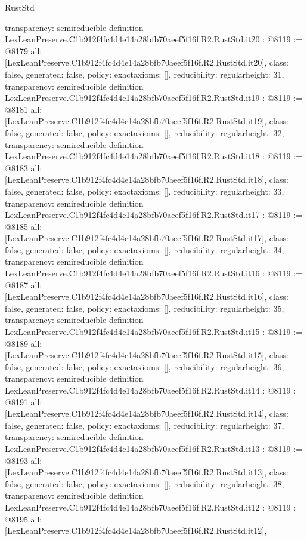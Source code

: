 \begin{lexlean}{RustStd}
\begin{coremodule}
{  transparency: semireducible
}
definition LexLeanPreserve.C1b912f4fc4d4e14a28bfb70aeef5f16f.R2.RustStd.it20 : @8119 := @8179 {
  all: [LexLeanPreserve.C1b912f4fc4d4e14a28bfb70aeef5f16f.R2.RustStd.it20],
  class: false,
  generated: false,
  policy: exact{axioms: []},
  reducibility: regular{height: 31},
  transparency: semireducible
}
definition LexLeanPreserve.C1b912f4fc4d4e14a28bfb70aeef5f16f.R2.RustStd.it19 : @8119 := @8181 {
  all: [LexLeanPreserve.C1b912f4fc4d4e14a28bfb70aeef5f16f.R2.RustStd.it19],
  class: false,
  generated: false,
  policy: exact{axioms: []},
  reducibility: regular{height: 32},
  transparency: semireducible
}
definition LexLeanPreserve.C1b912f4fc4d4e14a28bfb70aeef5f16f.R2.RustStd.it18 : @8119 := @8183 {
  all: [LexLeanPreserve.C1b912f4fc4d4e14a28bfb70aeef5f16f.R2.RustStd.it18],
  class: false,
  generated: false,
  policy: exact{axioms: []},
  reducibility: regular{height: 33},
  transparency: semireducible
}
definition LexLeanPreserve.C1b912f4fc4d4e14a28bfb70aeef5f16f.R2.RustStd.it17 : @8119 := @8185 {
  all: [LexLeanPreserve.C1b912f4fc4d4e14a28bfb70aeef5f16f.R2.RustStd.it17],
  class: false,
  generated: false,
  policy: exact{axioms: []},
  reducibility: regular{height: 34},
  transparency: semireducible
}
definition LexLeanPreserve.C1b912f4fc4d4e14a28bfb70aeef5f16f.R2.RustStd.it16 : @8119 := @8187 {
  all: [LexLeanPreserve.C1b912f4fc4d4e14a28bfb70aeef5f16f.R2.RustStd.it16],
  class: false,
  generated: false,
  policy: exact{axioms: []},
  reducibility: regular{height: 35},
  transparency: semireducible
}
definition LexLeanPreserve.C1b912f4fc4d4e14a28bfb70aeef5f16f.R2.RustStd.it15 : @8119 := @8189 {
  all: [LexLeanPreserve.C1b912f4fc4d4e14a28bfb70aeef5f16f.R2.RustStd.it15],
  class: false,
  generated: false,
  policy: exact{axioms: []},
  reducibility: regular{height: 36},
  transparency: semireducible
}
definition LexLeanPreserve.C1b912f4fc4d4e14a28bfb70aeef5f16f.R2.RustStd.it14 : @8119 := @8191 {
  all: [LexLeanPreserve.C1b912f4fc4d4e14a28bfb70aeef5f16f.R2.RustStd.it14],
  class: false,
  generated: false,
  policy: exact{axioms: []},
  reducibility: regular{height: 37},
  transparency: semireducible
}
definition LexLeanPreserve.C1b912f4fc4d4e14a28bfb70aeef5f16f.R2.RustStd.it13 : @8119 := @8193 {
  all: [LexLeanPreserve.C1b912f4fc4d4e14a28bfb70aeef5f16f.R2.RustStd.it13],
  class: false,
  generated: false,
  policy: exact{axioms: []},
  reducibility: regular{height: 38},
  transparency: semireducible
}
definition LexLeanPreserve.C1b912f4fc4d4e14a28bfb70aeef5f16f.R2.RustStd.it12 : @8119 := @8195 {
  all: [LexLeanPreserve.C1b912f4fc4d4e14a28bfb70aeef5f16f.R2.RustStd.it12],
}
\end{coremodule}
\end{lexlean}
